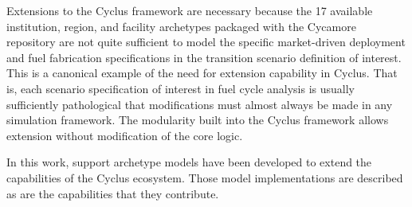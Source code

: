 

Extensions to the Cyclus framework are necessary because the 17 available
institution, region, and facility archetypes packaged with the Cycamore
repository are not quite sufficient to model the specific market-driven
deployment and fuel fabrication specifications in the transition scenario
definition of interest. This is a canonical example of the need for extension
capability in Cyclus. That is, each scenario specification of interest in fuel
cycle analysis is usually sufficiently pathological that modifications must
almost always be made in any simulation framework. The modularity built into
the Cyclus framework allows extension without modification of the core logic.  

In this work, support archetype models have been developed to extend the
capabilities of the Cyclus ecosystem. Those model implementations are described
as are the capabilities that they contribute. 
